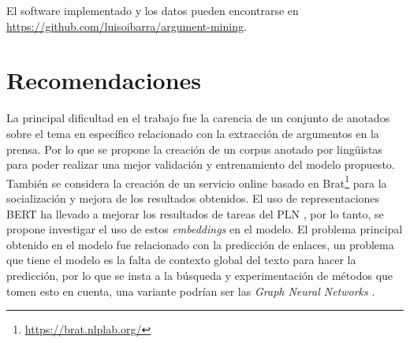 \documentclass[a4paper,11pt,twocolumn,twoside]{article}
\begin{document}

El software implementado y los datos pueden encontrarse en \url{https://github.com/luisoibarra/argument-mining}.

\section{Recomendaciones}

La principal dificultad en el trabajo fue la carencia de un conjunto de anotados
sobre el tema en específico relacionado con la extracción de argumentos en la prensa.
Por lo que se propone la creación de un corpus anotado por lingüistas para poder realizar una mejor 
validación y entrenamiento del modelo propuesto. También se considera la creación de un servicio 
online basado en Brat\footnote{\url{https://brat.nlplab.org/}} para la socialización y mejora de 
los resultados obtenidos.
El uso de representaciones BERT \cite{devlin2019bert} ha llevado a mejorar los resultados de tareas del PLN \cite{mayer2020transformer}, 
por lo tanto, se propone investigar el uso de estos \textit{embeddings} en 
el modelo. El problema principal obtenido en el modelo fue relacionado con la 
predicción de enlaces, un problema que tiene el modelo es la falta de contexto global
del texto para hacer la predicción, por lo que se insta a la búsqueda y experimentación
de métodos que tomen esto en cuenta, una variante podrían ser las \textit{Graph Neural Networks} \cite{wu2021comprehensive}.
\end{document}
